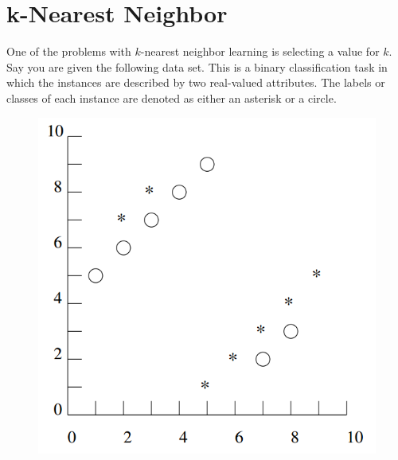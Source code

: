 \documentclass[11pt]{article}
\begin{document}
\ifsolution{\newpage}
\section{k-Nearest Neighbor }
One of the problems with $k$-nearest neighbor learning is selecting a value for $k$. Say you are given the following data set. This is a binary classification task in which the instances are described by two real-valued attributes. The labels or classes of each instance are denoted as either an asterisk or a circle.
\begin{figure}[H]
\centering
\includegraphics[scale=0.5]{knn.png}
\end{figure}
\end{document}
